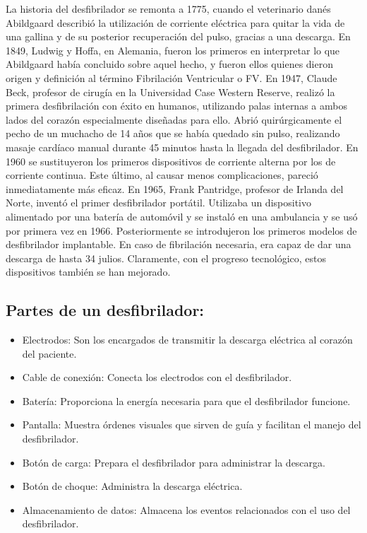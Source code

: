 La historia del desfibrilador se remonta a 1775, cuando el veterinario danés Abildgaard describió la utilización de corriente eléctrica para quitar la vida de una gallina y de su posterior recuperación del pulso, gracias a una descarga. En 1849, Ludwig y Hoffa, en Alemania, fueron los primeros en interpretar lo que Abildgaard había concluido sobre aquel hecho, y fueron ellos quienes dieron origen y definición al término Fibrilación Ventricular o FV. En 1947, Claude Beck, profesor de cirugía en la Universidad Case Western Reserve, realizó la primera desfibrilación con éxito en humanos, utilizando palas internas a ambos lados del corazón especialmente diseñadas para ello. Abrió quirúrgicamente el pecho de un muchacho de 14 años que se había quedado sin pulso, realizando masaje cardíaco manual durante 45 minutos hasta la llegada del desfibrilador. \newline \hfill \break
En 1960 se sustituyeron los primeros dispositivos de corriente alterna por los de corriente continua. Este último, al causar menos complicaciones, pareció inmediatamente más eficaz. En 1965, Frank Pantridge, profesor de Irlanda del Norte, inventó el primer desfibrilador portátil. Utilizaba un dispositivo alimentado por una batería de automóvil y se instaló en una ambulancia y se usó por primera vez en 1966. Posteriormente se introdujeron los primeros modelos de desfibrilador implantable. En caso de fibrilación necesaria, era capaz de dar una descarga de hasta 34 julios. Claramente, con el progreso tecnológico, estos dispositivos también se han mejorado.


\subsection{Partes de un desfibrilador:}
\begin{itemize}
    \item Electrodos: Son los encargados de transmitir la descarga eléctrica al corazón del paciente.
    \item Cable de conexión: Conecta los electrodos con el desfibrilador.
    \item Batería: Proporciona la energía necesaria para que el desfibrilador funcione.
    \item Pantalla: Muestra órdenes visuales que sirven de guía y facilitan el manejo del desfibrilador.
    \item Botón de carga: Prepara el desfibrilador para administrar la descarga.
    \item Botón de choque: Administra la descarga eléctrica.
    \item Almacenamiento de datos: Almacena los eventos relacionados con el uso del desfibrilador.
\end{itemize}

